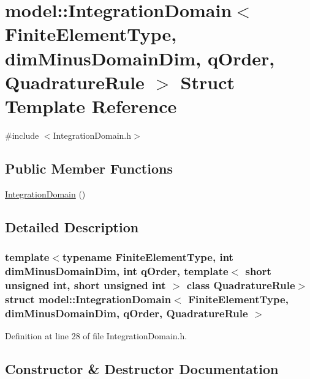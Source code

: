 \hypertarget{structmodel_1_1_integration_domain}{}\section{model\+:\+:Integration\+Domain$<$ Finite\+Element\+Type, dim\+Minus\+Domain\+Dim, q\+Order, Quadrature\+Rule $>$ Struct Template Reference}
\label{structmodel_1_1_integration_domain}


{\ttfamily \#include $<$Integration\+Domain.\+h$>$}

\subsection*{Public Member Functions}
\begin{DoxyCompactItemize}
\item 
\hyperlink{structmodel_1_1_integration_domain_a4845bb462d02593a3a899c294fac0d11}{Integration\+Domain} ()
\end{DoxyCompactItemize}


\subsection{Detailed Description}
\subsubsection*{template$<$typename Finite\+Element\+Type, int dim\+Minus\+Domain\+Dim, int q\+Order, template$<$ short unsigned int, short unsigned int $>$ class Quadrature\+Rule$>$struct model\+::\+Integration\+Domain$<$ Finite\+Element\+Type, dim\+Minus\+Domain\+Dim, q\+Order, Quadrature\+Rule $>$}



Definition at line 28 of file Integration\+Domain.\+h.



\subsection{Constructor \& Destructor Documentation}
\hypertarget{structmodel_1_1_integration_domain_a4845bb462d02593a3a899c294fac0d11}{}
